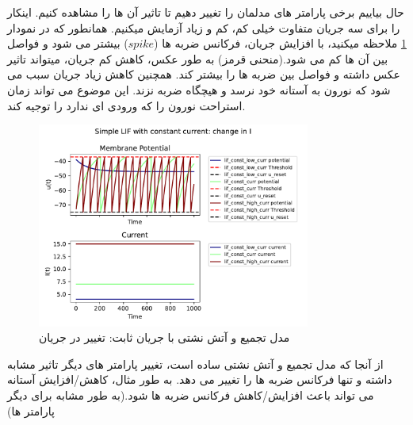 \documentclass{article}
\begin{document}
            حال بیاییم برخی پارامتر های مدلمان را تغییر دهیم تا تاثیر آن ها را مشاهده کنیم. اینکار را برای سه جریان متفاوت خیلی کم، کم و زیاد آزمایش میکنیم. همانطور که در نمودار 
            \ref{fig:lif-const-change-current-curr} 
            ملاحظه میکنید، با افزایش جریان، فرکانس ضربه ها
            ($spike$)
            بیشتر می شود و فواصل بین آن ها کم می شود.(منحنی قرمز)
            به طور عکس، کاهش کم جریان، میتواند تاثیر عکس داشته و فواصل بین ضربه ها را بیشتر کند.
            همچنین کاهش زیاد جریان سبب می شود که نورون به آستانه خود نرسد و هیچگاه ضربه نزند. این موضوع می تواند زمان استراحت نورون را که ورودی ای ندارد را توجیه کند.

            \begin{figure}[H]
                \centering
                \includegraphics[width=0.8\textwidth]{plots/Simple LIF with constant current: change in I.pdf} 
                \caption{مدل تجمیع و آتش نشتی با جریان ثابت: تغییر در جریان}
                \label{fig:lif-const-change-current-curr}
            \end{figure}

            از آنجا که مدل تجمیع و آتش نشتی ساده است، تغییر پارامتر های دیگر تاثیر مشابه داشته و تنها فرکانس ضربه ها را تغییر می دهد. به طور مثال، کاهش/افزایش آستانه می تواند باعث افزایش/کاهش فرکانس ضربه ها شود.(به طور مشابه برای دیگر پارامتر ها)
\end{document}

